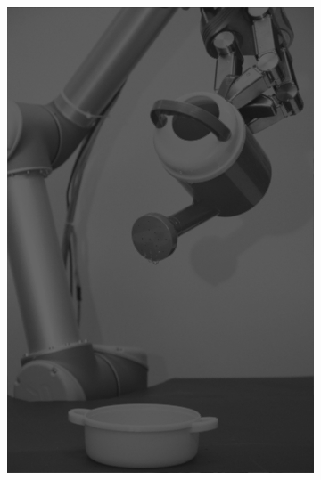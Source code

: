 \begin{figure}[H]
\begin{subfigure}[b]{0.1\textwidth}
        \includegraphics[width=\textwidth]{img3/test/contrast_5_0_4_final_img3.png}
    \end{subfigure}
    \begin{subfigure}[b]{0.1\textwidth}

\end{subfigure}
\end{figure}
